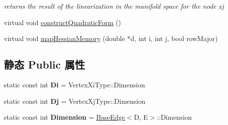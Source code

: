 \begin{DoxyCompactItemize}
\begin{DoxyCompactList}\small\item\em returns the result of the linearization in the manifold space for the node xj \end{DoxyCompactList}\item 
virtual void \hyperlink{classg2o_1_1BaseBinaryEdge_a06a18745d95017c6d3c841f838a65364}{construct\-Quadratic\-Form} ()
\item 
virtual void \hyperlink{classg2o_1_1BaseBinaryEdge_ada358930854d386a4e8c32f64078e052}{map\-Hessian\-Memory} (double $\ast$d, int i, int j, bool row\-Major)
\end{DoxyCompactItemize}
\subsection*{静态 Public 属性}
\begin{DoxyCompactItemize}
\item 
\hypertarget{classg2o_1_1BaseBinaryEdge_abfe232196405a7204bc299a747c1cc8b}{static const int {\bfseries Di} = Vertex\-Xi\-Type\-::\-Dimension}\label{classg2o_1_1BaseBinaryEdge_abfe232196405a7204bc299a747c1cc8b}

\item 
\hypertarget{classg2o_1_1BaseBinaryEdge_ab718b94950a34d589371fe6f5583b259}{static const int {\bfseries Dj} = Vertex\-Xj\-Type\-::\-Dimension}\label{classg2o_1_1BaseBinaryEdge_ab718b94950a34d589371fe6f5583b259}

\item 
\hypertarget{classg2o_1_1BaseBinaryEdge_af3c134948e48c446762fa4e427d1cca5}{static const int {\bfseries Dimension} = \hyperlink{classg2o_1_1BaseEdge}{Base\-Edge}$<$D, E$>$\-::Dimension}\label{classg2o_1_1BaseBinaryEdge_af3c134948e48c446762fa4e427d1cca5}

\end{DoxyCompactItemize}
